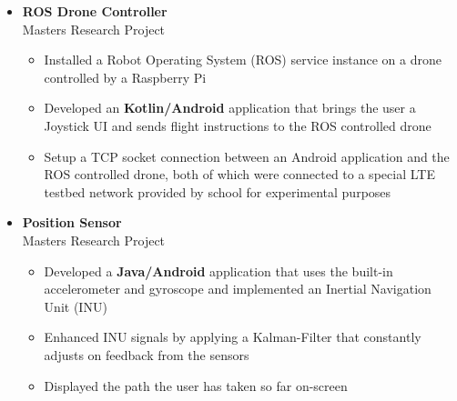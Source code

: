 \begin{itemize}[leftmargin=0pt, label={}]
\item{
{\sectionheading\large{\textbf{ROS Drone Controller}}}\\%
{\sectionheading\small{Masters Research Project}}\hfill

    \vspace{-6pt}
    \begin{itemize}[label=\textbullet, leftmargin=*, noitemsep]
        \item{Installed a Robot Operating System (ROS) service instance on a drone controlled by a Raspberry Pi}
        \item{Developed an \textbf{Kotlin/Android} application that brings the user a Joystick UI and sends flight instructions to the ROS controlled drone}
        \item{Setup a TCP socket connection between an Android application and the ROS controlled drone, both of which were connected to a special LTE testbed network provided by school for experimental purposes}
    \end{itemize}
}

\item{
{\sectionheading\large{\textbf{Position Sensor}}}\\%
{\sectionheading\small{Masters Research Project}}\hfill

    \vspace{-6pt}
    \begin{itemize}[label=\textbullet, leftmargin=*, noitemsep]%
        \item{Developed a \textbf{Java/Android} application that uses the built-in accelerometer and gyroscope and implemented an Inertial Navigation Unit (INU)}
        \item{Enhanced INU signals by applying a Kalman-Filter that constantly adjusts on feedback from the sensors}
        \item{Displayed the path the user has taken so far on-screen}
    \end{itemize}
}


\end{itemize}
